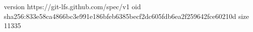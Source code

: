 version https://git-lfs.github.com/spec/v1
oid sha256:833e58ca4866bc3e991e186bfeb6385becf2dc605fdb6ea2f259642fce60210d
size 11335
